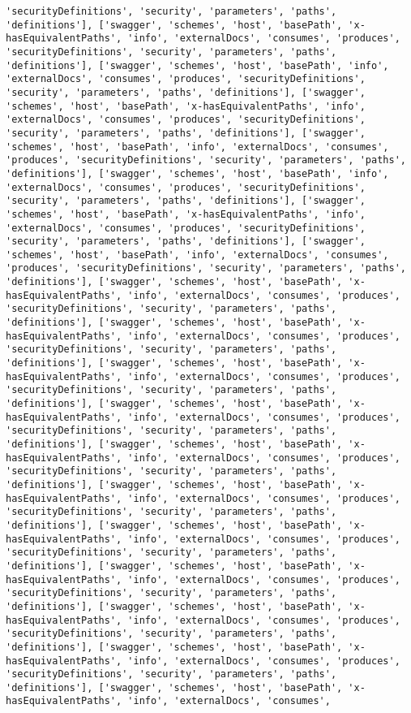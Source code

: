 \documentclass[11pt]{article}
\begin{document}
\begin{Verbatim}[commandchars=\\\{\}]
'securityDefinitions', 'security', 'parameters', 'paths', 'definitions'], ['swagger', 'schemes', 'host', 'basePath', 'x-hasEquivalentPaths', 'info', 'externalDocs', 'consumes', 'produces', 'securityDefinitions', 'security', 'parameters', 'paths', 'definitions'], ['swagger', 'schemes', 'host', 'basePath', 'info', 'externalDocs', 'consumes', 'produces', 'securityDefinitions', 'security', 'parameters', 'paths', 'definitions'], ['swagger', 'schemes', 'host', 'basePath', 'x-hasEquivalentPaths', 'info', 'externalDocs', 'consumes', 'produces', 'securityDefinitions', 'security', 'parameters', 'paths', 'definitions'], ['swagger', 'schemes', 'host', 'basePath', 'info', 'externalDocs', 'consumes', 'produces', 'securityDefinitions', 'security', 'parameters', 'paths', 'definitions'], ['swagger', 'schemes', 'host', 'basePath', 'info', 'externalDocs', 'consumes', 'produces', 'securityDefinitions', 'security', 'parameters', 'paths', 'definitions'], ['swagger', 'schemes', 'host', 'basePath', 'x-hasEquivalentPaths', 'info', 'externalDocs', 'consumes', 'produces', 'securityDefinitions', 'security', 'parameters', 'paths', 'definitions'], ['swagger', 'schemes', 'host', 'basePath', 'info', 'externalDocs', 'consumes', 'produces', 'securityDefinitions', 'security', 'parameters', 'paths', 'definitions'], ['swagger', 'schemes', 'host', 'basePath', 'x-hasEquivalentPaths', 'info', 'externalDocs', 'consumes', 'produces', 'securityDefinitions', 'security', 'parameters', 'paths', 'definitions'], ['swagger', 'schemes', 'host', 'basePath', 'x-hasEquivalentPaths', 'info', 'externalDocs', 'consumes', 'produces', 'securityDefinitions', 'security', 'parameters', 'paths', 'definitions'], ['swagger', 'schemes', 'host', 'basePath', 'x-hasEquivalentPaths', 'info', 'externalDocs', 'consumes', 'produces', 'securityDefinitions', 'security', 'parameters', 'paths', 'definitions'], ['swagger', 'schemes', 'host', 'basePath', 'x-hasEquivalentPaths', 'info', 'externalDocs', 'consumes', 'produces', 'securityDefinitions', 'security', 'parameters', 'paths', 'definitions'], ['swagger', 'schemes', 'host', 'basePath', 'x-hasEquivalentPaths', 'info', 'externalDocs', 'consumes', 'produces', 'securityDefinitions', 'security', 'parameters', 'paths', 'definitions'], ['swagger', 'schemes', 'host', 'basePath', 'x-hasEquivalentPaths', 'info', 'externalDocs', 'consumes', 'produces', 'securityDefinitions', 'security', 'parameters', 'paths', 'definitions'], ['swagger', 'schemes', 'host', 'basePath', 'x-hasEquivalentPaths', 'info', 'externalDocs', 'consumes', 'produces', 'securityDefinitions', 'security', 'parameters', 'paths', 'definitions'], ['swagger', 'schemes', 'host', 'basePath', 'x-hasEquivalentPaths', 'info', 'externalDocs', 'consumes', 'produces', 'securityDefinitions', 'security', 'parameters', 'paths', 'definitions'], ['swagger', 'schemes', 'host', 'basePath', 'x-hasEquivalentPaths', 'info', 'externalDocs', 'consumes', 'produces', 'securityDefinitions', 'security', 'parameters', 'paths', 'definitions'], ['swagger', 'schemes', 'host', 'basePath', 'x-hasEquivalentPaths', 'info', 'externalDocs', 'consumes', 'produces', 'securityDefinitions', 'security', 'parameters', 'paths', 'definitions'], ['swagger', 'schemes', 'host', 'basePath', 'x-hasEquivalentPaths', 'info', 'externalDocs', 'consumes', 
\end{Verbatim}
\end{document}
